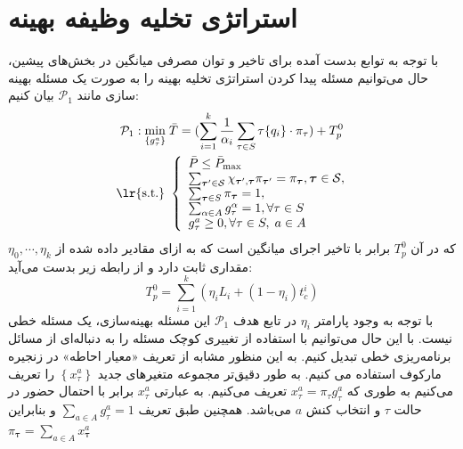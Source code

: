 \section{استراتژی تخلیه وظیفه بهینه}
\label{sec:strat}
با توجه به توابع بدست آمده برای تاخیر و توان مصرفی میانگین در بخش‌های پیشین، حال می‌توانیم مسئله پیدا کردن استراتژی تخلیه بهینه را به صورت یک مسئله بهینه سازی مانند
$\mathcal{P}_{1}$
بیان کنیم:
\begin{equation}
		\begin{aligned}
			\mathcal{P}_{1}: \min _{\left\{g_{\tau}^{a}\right\}}\; & \bar{T} = (\sum_{i=1}^{k} \frac{1}{\alpha_i} \sum_{\tau \in S} \tau\{q_i\} \cdot \pi_{\tau}) + T_p^0 \\
			\text { \lr{s.t.} } &\left\{\begin{array}{l}
				\bar{P} \leq \bar{P}_{\max } \\
				\sum_{\boldsymbol{\tau}^{\prime} \in \mathcal{S}} \chi_{\boldsymbol{\tau}^{\prime}, \boldsymbol{\tau}} \pi_{\boldsymbol{\tau}^{\prime}}=\pi_{\boldsymbol{\tau}}, \boldsymbol{\tau} \in \mathcal{S}, \\
				\sum_{\boldsymbol{\tau} \in S} \pi_{\boldsymbol{\tau}}=1, \\
				\sum_{\alpha \in A} g_{\tau}^{\alpha}=1, \forall \tau \in S\\
				g_{\tau}^{a} \geq 0, \forall \tau \in S,\;a \in A
			\end{array}\right.
		\end{aligned}
\end{equation}
که در آن
$T_p^0$
برابر با تاخیر اجرای میانگین است که به ازای مقادیر داده شده از
$\eta_0, \cdots, \eta_k$
مقداری ثابت دارد و از رابطه زیر بدست می‌آید:
\begin{equation}
	T_p^0 = \sum_{i=1}^{k} (\eta_i L_i+(1-\eta_i) t_{c}^i)
\end{equation}
\clearpage
با توجه به وجود پارامتر $\eta_i$ در تابع هدف
$\mathcal{P}_{1}$
این مسئله بهینه‌سازی، یک مسئله خطی نیست. با این حال می‌توانیم با استفاده از تغییری کوچک مسئله را به دنباله‌ای از مسائل برنامه‌ریزی خطی تبدیل کنیم. به این منظور مشابه \cite{Liu} از تعریف «معیار احاطه» در زنجیره مارکوف استفاده می کنیم. به طور دقیق‌تر مجموعه متغیرهای جدید $\left\{x_{\tau}^{a}\right\}$ را تعریف می‌کنیم به طوری که  $x_{\tau}^{a}=\pi_{\tau} g_{\tau}^{a}$ تعریف می‌کنیم. به عبارتی $x_{\tau}^{a}$ برابر با احتمال حضور در حالت $\tau$ و انتخاب کنش
$a$
می‌باشد. همچنین طبق تعریف 
$\sum_{a \in A} g_{\tau}^{a}=1$
و بنابراین
$\pi_{\boldsymbol{\tau}}=\sum_{a \in A} x_{\boldsymbol{\tau}}^{a}$
\\\\
